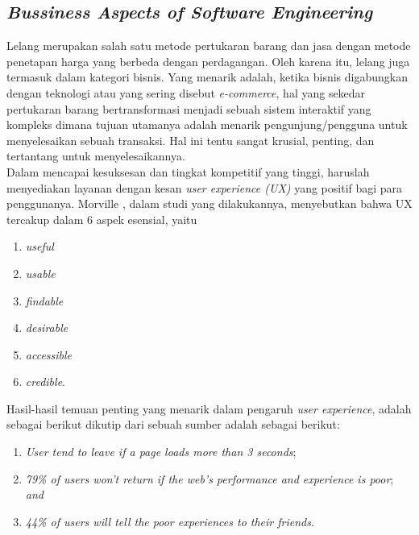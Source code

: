 \subsection{\textit{Bussiness Aspects of Software Engineering}}
	
	Lelang merupakan salah satu metode pertukaran barang dan jasa dengan metode penetapan harga yang berbeda dengan perdagangan. Oleh karena itu, lelang juga termasuk dalam kategori bisnis. Yang menarik adalah, ketika bisnis digabungkan dengan teknologi atau yang sering disebut \textit{e-commerce}, hal yang sekedar pertukaran barang bertransformasi menjadi sebuah sistem interaktif yang kompleks dimana tujuan utamanya adalah menarik pengunjung/pengguna untuk menyelesaikan sebuah transaksi. Hal ini tentu sangat krusial, penting, dan tertantang untuk menyelesaikannya. \\
	\indent Dalam mencapai kesuksesan dan tingkat kompetitif yang tinggi, haruslah menyediakan layanan dengan kesan \textit{user experience (UX)} yang positif bagi para penggunanya. Morville  \cite[p.~27]{a-set-of-heuristics-2014} , dalam studi yang dilakukannya, menyebutkan bahwa UX tercakup dalam 6 aspek esensial, yaitu \begin{enumerate}[label=\alph*.]
		\item \textit{useful}
		\item \textit{usable}
		\item \textit{findable}
		\item \textit{desirable}
		\item \textit{accessible}
		\item \textit{credible}.
		\end{enumerate}
	
	\indent Hasil-hasil temuan penting yang menarik dalam pengaruh \textit{user experience}, adalah sebagai berikut dikutip dari sebuah sumber adalah sebagai berikut:
	\begin{enumerate}[label=\alph*.]
		\item \textit{User tend to leave if a page loads more than 3 seconds};
		\item \textit{79\% of users won't return if the web's performance and experience is poor}; \textit{and}
		\item \textit{44\% of users will tell the poor experiences to their friends}.
	\end{enumerate}
	

